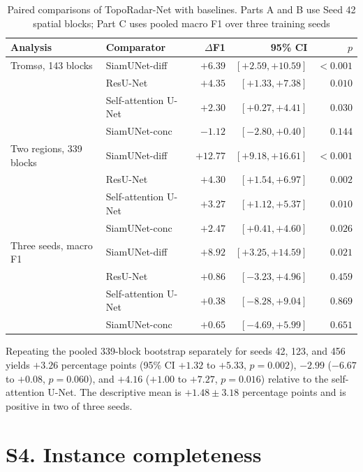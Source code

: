 \documentclass[11pt,a4paper]{article}
\begin{document}
\begin{table}[h]
\caption{Paired comparisons of TopoRadar-Net with baselines. Parts A and B use Seed 42 spatial blocks; Part C uses pooled macro F1 over three training seeds}
\centering
\small
\begin{tabular}{llrrr}
\toprule
Analysis & Comparator & $\Delta$F1 & 95\% CI & $p$ \\
\midrule
Troms{\o}, 143 blocks & SiamUNet-diff & $+6.39$ & $[+2.59,+10.59]$ & $<0.001$ \\
 & ResU-Net & $+4.35$ & $[+1.33,+7.38]$ & $0.010$ \\
 & Self-attention U-Net & $+2.30$ & $[+0.27,+4.41]$ & $0.030$ \\
 & SiamUNet-conc & $-1.12$ & $[-2.80,+0.40]$ & $0.144$ \\
\midrule
Two regions, 339 blocks & SiamUNet-diff & $+12.77$ & $[+9.18,+16.61]$ & $<0.001$ \\
 & ResU-Net & $+4.30$ & $[+1.54,+6.97]$ & $0.002$ \\
 & Self-attention U-Net & $+3.27$ & $[+1.12,+5.37]$ & $0.010$ \\
 & SiamUNet-conc & $+2.47$ & $[+0.41,+4.60]$ & $0.026$ \\
\midrule
Three seeds, macro F1 & SiamUNet-diff & $+8.92$ & $[+3.25,+14.59]$ & $0.021$ \\
 & ResU-Net & $+0.86$ & $[-3.23,+4.96]$ & $0.459$ \\
 & Self-attention U-Net & $+0.38$ & $[-8.28,+9.04]$ & $0.869$ \\
 & SiamUNet-conc & $+0.65$ & $[-4.69,+5.99]$ & $0.651$ \\
\bottomrule
\end{tabular}
\end{table}

Repeating the pooled 339-block bootstrap separately for seeds 42, 123, and 456 yields $+3.26$ percentage points (95\% CI $+1.32$ to $+5.33$, $p=0.002$), $-2.99$ ($-6.67$ to $+0.08$, $p=0.060$), and $+4.16$ ($+1.00$ to $+7.27$, $p=0.016$) relative to the self-attention U-Net. The descriptive mean is $+1.48\pm3.18$ percentage points and is positive in two of three seeds.

\section*{S4. Instance completeness}
\end{document}
